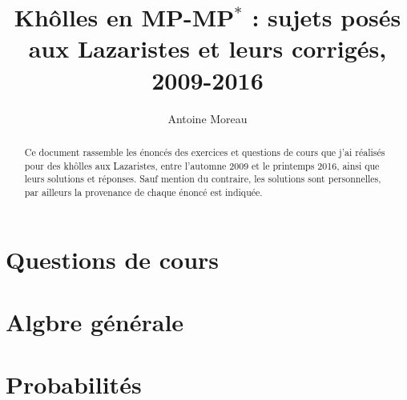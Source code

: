 \documentclass[a4paper,10pt]{report}
\title{Kh\^olles en MP-MP${}^{\ast}$ : sujets pos\'es aux Lazaristes et leurs corrig\'es, 2009-2016}
\author{Antoine Moreau}
\begin{document}
\maketitle

\begin{abstract}
Ce document rassemble les \'enonc\'es des exercices et questions de cours que j'ai r\'ealis\'es pour des kh\^olles aux Lazaristes, %
entre l'automne 2009 et le printemps 2016, %
ainsi que leurs solutions et r\'eponses. %
Sauf mention du contraire, les solutions sont personnelles, par ailleurs la provenance de chaque \'enonc\'e est indiqu\'ee.
\end{abstract}

\chapter{Questions de cours}
%






\chapter{Algbre g\'en\'erale}





\chapter{Probabilit\'es}






\end{document}
